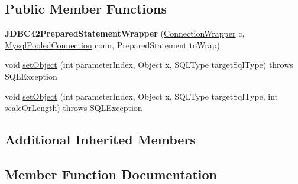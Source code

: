 \subsection*{Public Member Functions}
\begin{DoxyCompactItemize}
\item 
\mbox{\label{classcom_1_1mysql_1_1jdbc_1_1jdbc2_1_1optional_1_1_j_d_b_c42_prepared_statement_wrapper_a74c9741201abbf0485db73ee300d5163}} 
{\bfseries J\+D\+B\+C42\+Prepared\+Statement\+Wrapper} (\mbox{\hyperlink{classcom_1_1mysql_1_1jdbc_1_1jdbc2_1_1optional_1_1_connection_wrapper}{Connection\+Wrapper}} c, \mbox{\hyperlink{classcom_1_1mysql_1_1jdbc_1_1jdbc2_1_1optional_1_1_mysql_pooled_connection}{Mysql\+Pooled\+Connection}} conn, Prepared\+Statement to\+Wrap)
\item 
void \mbox{\hyperlink{classcom_1_1mysql_1_1jdbc_1_1jdbc2_1_1optional_1_1_j_d_b_c42_prepared_statement_wrapper_ab4680c3afbc4722ea8b2a780f9eae04b}{set\+Object}} (int parameter\+Index, Object x, S\+Q\+L\+Type target\+Sql\+Type)  throws S\+Q\+L\+Exception 
\item 
void \mbox{\hyperlink{classcom_1_1mysql_1_1jdbc_1_1jdbc2_1_1optional_1_1_j_d_b_c42_prepared_statement_wrapper_a835cf41a07a0fdba6bcb579a33f16c69}{set\+Object}} (int parameter\+Index, Object x, S\+Q\+L\+Type target\+Sql\+Type, int scale\+Or\+Length)  throws S\+Q\+L\+Exception 
\end{DoxyCompactItemize}
\subsection*{Additional Inherited Members}


\subsection{Member Function Documentation}
\mbox{\label{classcom_1_1mysql_1_1jdbc_1_1jdbc2_1_1optional_1_1_j_d_b_c42_prepared_statement_wrapper_ab4680c3afbc4722ea8b2a780f9eae04b}} 
